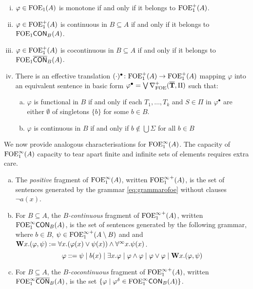 \begin{theorem}\label{th:ofoe-normalforms} 
\begin{enumerate}[(i)]
\item $\varphi  \in \mathrm{FOE}_1(A)$ is monotone if and only if it belongs to $\mathrm{FOE}_1^{+}(A)$. 
\item $\varphi  \in \mathrm{FOE}_1^{+}(A)$ is continuous in $B \subseteq A$ if and only if it belongs to $\mathrm{FOE}_1\mathsf{CON}_{B}(A)$. 
\item $\varphi  \in \mathrm{FOE}_1^{+}(A)$ is cocontinuous in $B \subseteq A$ if and only if it belongs to $\mathrm{FOE}_1\overline{\mathsf{CON}}_{B}(A)$. 
\item There is an effective translation $(\cdot)^{\bullet} \colon \mathrm{FOE}_1^{+}(A) \to \mathrm{FOE}_1^{+}(A)$ mapping $\varphi$ into an equivalent sentence in basic form $\varphi^{\bullet} = \bigvee \nabla^+_{\mathrm{FOE}}(\overline{{\mathbf{T}}},\Pi)$ such that:
\begin{enumerate}[(a)]
\item $\varphi$ is functional in $B$ if and only if each $T_1, \dots, T_k$ and $S \in \Pi$ in $\varphi^{\bullet}$ are either $\emptyset$ of singletons $\{b\}$ for some $b \in B$.
\item $\varphi$ is continuous in $B$ if and only if $b\notin \bigcup\Sigma$ for all $b \in B$
\end{enumerate}
\end{enumerate}
\end{theorem}




We now provide analogous characterisations for $\mathrm{FOE}^{\infty}_1(A)$. The capacity of $\mathrm{FOE}^{\infty}_1(A)$ capacity to tear apart finite and infinite sets of elements requires extra care.

\begin{definition}
\begin{enumerate}[(a)]
\item The \emph{positive} fragment of $\mathrm{FOE}^{\infty}_1(A)$, written ${\mathrm{FOE}^{\infty}_1}^{+}(A)$, is the set of sentences generated by the grammar \eqref{eq:grammarofoe} without clauses $\lnot a(x)$. 
\item For $B \subseteq A$, the \emph{$B$-continuous} fragment of ${\mathrm{FOE}^{\infty}_1}^{+}(A)$, written $\mathrm{FOE}^{\infty}_1\mathsf{CON}_{B}(A)$, is the set of sentences generated by the following grammar, where $b \in B$, $\psi \in {\ensuremath{\mathrm{FOE}^{\infty}_1}}^{+}(A \setminus B)$ and and $\mathbf{W} x.(\varphi,\psi) \mathrel{: =} \forall x.(\varphi(x) \lor \psi(x)) \land \forall^\infty x.\psi(x)$.
\[
\varphi ::= \psi \mid b(x) \mid \exists x.\varphi \mid \varphi \land \varphi \mid \varphi \lor \varphi \mid \mathbf{W} x.(\varphi,\psi)
\]
\item For $B \subseteq A$, the \emph{$B$-cocontinuous} fragment of ${\mathrm{FOE}^{\infty}_1}^{+}(A)$, written $\mathrm{FOE}^{\infty}_1\overline{\mathsf{CON}}_{B}(A)$, is the set $\{\varphi \mid \varphi^\delta \in \mathrm{FOE}^{\infty}_1\mathsf{CON}_{B}(A)\}$.
\end{enumerate}
\end{definition}

